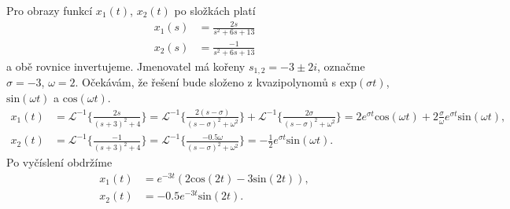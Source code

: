 \documentclass[twoside]{article}
\begin{document}
Pro obrazy funkcí $x_1(t)$, $x_2(t)$ po složkách platí
\begin{equation*}
	\begin{split}
		x_1(s) &= \frac{2s}{s^2 + 6s + 13} \\
		x_2(s) &= \frac{-1}{s^2 + 6s + 13}
	\end{split}
\end{equation*}
a obě rovnice invertujeme. Jmenovatel má kořeny $s_{1,2} = -3 \pm 2i$, označme $\sigma = -3$, $\omega = 2$. Očekávám, že řešení bude složeno 
z kvazipolynomů s $\text{exp}(\sigma t)$, $\text{sin}(\omega t)$ a $\text{cos}(\omega t)$.
\begin{equation*}
	\begin{split}
		x_1(t) &= \mathcal{L}^{-1}\{\frac{2s}{(s+3)^2 + 4}\} = \mathcal{L}^{-1}\{\frac{2(s - \sigma)}{(s-\sigma)^2 + \omega^2}\} + \mathcal{L}^{-1}\{\frac{2\sigma}{(s-\sigma)^2 + \omega^2}\} = 
		2 e^{\sigma t} \text{cos}(\omega t) + 2 \frac{\sigma}{\omega} e^{\sigma t} \text{sin}(\omega t),\\
		x_2(t) &= \mathcal{L}^{-1}\{\frac{-1}{(s+3)^2 + 4}\} = \mathcal{L}^{-1}\{\frac{-0.5 \omega}{(s-\sigma)^2 + \omega^2}\} = -\frac{1}{2} e^{\sigma t} \text{sin}(\omega t).
	\end{split}
\end{equation*}
Po vyčíslení obdržíme
\begin{equation*}
	\begin{split}
		x_1(t) &= e^{-3t}(2\text{cos}(2t) -3 \text{sin}(2t)), \\
		x_2(t) &= -0.5 e^{-3t}\text{sin}(2t).
	\end{split}
\end{equation*}
\end{document}

